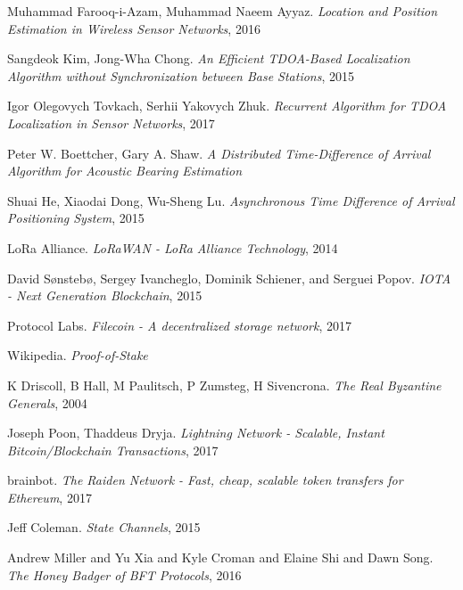 \documentclass[10pt, nonatbib, nocopyrightspace, reprint]{sigplanconf}
\begin{document}
\begin{thebibliography}{10}
    Muhammad Farooq-i-Azam, Muhammad Naeem Ayyaz.
    \emph{Location and Position Estimation in Wireless Sensor Networks}, 2016

    Sangdeok Kim, Jong-Wha Chong.
    \emph{An Efficient TDOA-Based Localization Algorithm without Synchronization between Base Stations}, 2015

    Igor Olegovych Tovkach, Serhii Yakovych Zhuk.
    \emph{Recurrent Algorithm for TDOA Localization in Sensor Networks}, 2017

    Peter W. Boettcher, Gary A. Shaw.
    \emph{A Distributed Time-Difference of Arrival Algorithm for Acoustic Bearing Estimation}

    Shuai He, Xiaodai Dong, Wu-Sheng Lu.
    \emph{Asynchronous Time Difference of Arrival Positioning System}, 2015

    LoRa Alliance.
    \emph{LoRaWAN - LoRa Alliance Technology}, 2014

    David Sønstebø, Sergey Ivancheglo, Dominik Schiener, and Serguei Popov.
    \emph{IOTA - Next Generation Blockchain}, 2015

    Protocol Labs.
    \emph{Filecoin - A decentralized storage network}, 2017

    Wikipedia.
    \emph{Proof-of-Stake}

     K Driscoll, B Hall, M Paulitsch, P Zumsteg, H Sivencrona.
     \emph{The Real Byzantine Generals}, 2004

    Joseph Poon, Thaddeus Dryja.
    \emph{Lightning Network - Scalable, Instant Bitcoin/Blockchain Transactions}, 2017

    brainbot.
    \emph{The Raiden Network - Fast, cheap, scalable token transfers for Ethereum}, 2017

    Jeff Coleman.
    \emph{State Channels}, 2015

    Andrew Miller and Yu Xia and Kyle Croman and Elaine Shi and Dawn Song.
    \emph{The Honey Badger of BFT Protocols}, 2016

\end{thebibliography}
\end{document}
